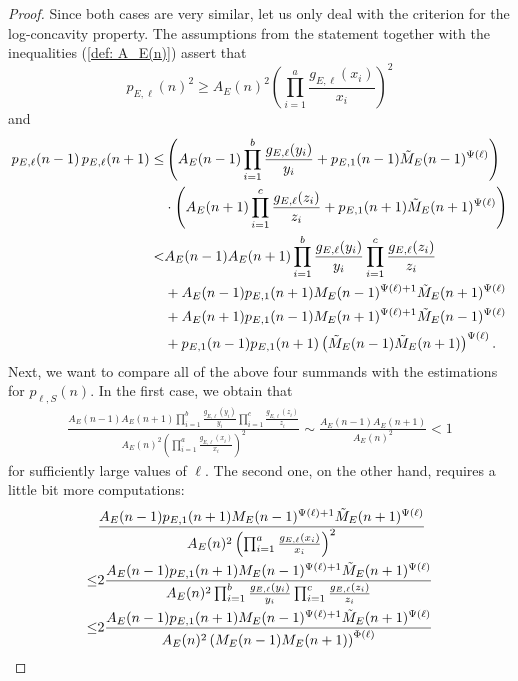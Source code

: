\documentclass[10pt,a4paper]{amsart}
\begin{document}
\begin{proof}
Since both cases are very similar, let us only deal with the criterion for the log-concavity property. The assumptions from the statement together with the inequalities (\ref{def: A_E(n)}) assert that
\begin{equation*}
p_{E,\ell }(n)^2\geq A_E(n)^2\left(\prod_{i=1}^a\frac{g_{E,\ell }(x_i)}{x_i}\right)^2
\end{equation*}
and
\begin{align*}
p_{E,\ell }(n-1) \, p_{E,\ell }(n+1)\leq &\left(A_E(n-1)\prod_{i=1}^b\frac{g_{E,\ell }(y_i)}{y_i}+p_{E,1}(n-1)\Tilde{M}_E(n-1)^{\Psi(\ell)}\right)\\
&{}\cdot
\left(A_E(n+1)\prod_{i=1}^c\frac{g_{E,\ell }(z_i)}{z_i}+p_{E,1}(n+1)\Tilde{M}_E(n+1)^{\Psi(\ell)}\right)\\
<& A_E(n-1)A_E(n+1)\prod_{i=1}^b\frac{g_{E,\ell }(y_i)}{y_i}\prod_{i=1}^c\frac{g_{E,\ell }(z_i)}{z_i}\\
&{}+
A_E(n-1)p_{E,1}(n+1)M_E(n-1)^{\Psi(\ell)+1}\Tilde{M}_E(n+1)^{\Psi(\ell)}\\
&{}+
A_E(n+1)p_{E,1}(n-1)M_E(n+1)^{\Psi(\ell)+1}\Tilde{M}_E(n-1)^{\Psi(\ell)}\\
&{}+
p_{E,1}(n-1)p_{E,1}(n+1)\left(\Tilde{M}_E(n-1)\Tilde{M}_E(n+1)\right)^{\Psi(\ell)}.
\end{align*}
Next, we want to compare all of the above four summands with the estimations for $p_{\ell,S}(n)$.
In the first case, we obtain that
\begin{align*}
\frac{A_E(n-1)A_E(n+1)\prod_{i=1}^b\frac{g_{E,\ell }(y_i)}{y_i}\prod_{i=1}^c\frac{g_{E,\ell }(z_i)}{z_i}}{A_E(n)^2\left(\prod_{i=1}^a\frac{g_{E,\ell }(x_i)}{x_i}\right)^2}
\sim \frac{A_E(n-1)A_E(n+1)}{A_E(n)^2}<1
\end{align*}
for sufficiently large values of
$\ell $.
The second one, on the other hand, requires a little bit more computations:
\begin{align*}
&\frac{A_E(n-1)p_{E,1}(n+1)M_E(n-1)^{\Psi(\ell)+1}\Tilde{M}_E(n+1)^{\Psi(\ell)}}{A_E(n)^2\left(\prod_{i=1}^a\frac{g_{E,\ell }(x_i)}{x_i}\right)^2}\\
\leq
&2\frac{A_E(n-1)p_{E,1}(n+1)M_E(n-1)^{\Psi(\ell)+1}\Tilde{M}_E(n+1)^{\Psi(\ell)}}{A_E(n)^2\prod_{i=1}^b\frac{g_{E,\ell }(y_i)}{y_i}\prod_{i=1}^c\frac{g_{E,\ell }(z_i)}{z_i}}\\
\leq& 2\frac{A_E(n-1)p_{E,1}(n+1)M_E(n-1)^{\Psi(\ell)+1}\Tilde{M}_E(n+1)^{\Psi(\ell)}}{A_E(n)^2\left(M_E(n-1)M_E(n+1)\right)^{\Phi(\ell)}}\\

\end{align*}
\end{proof}
\end{document}
